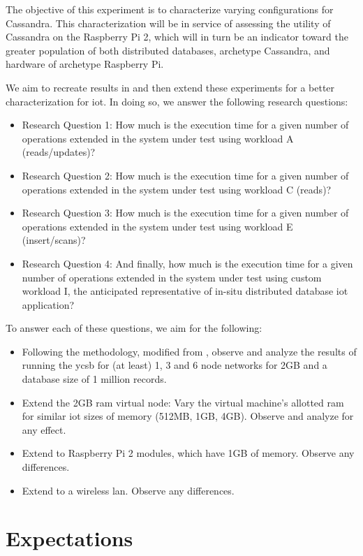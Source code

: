 The objective of this experiment is to characterize varying configurations for Cassandra.  This characterization will be in service of assessing the utility of Cassandra on the Raspberry Pi 2, which will in turn be an indicator toward the greater population of both distributed databases, archetype Cassandra, and hardware of archetype Raspberry Pi.

We aim to recreate results in \cite{Abramova2014} and then extend these experiments for a better characterization for \gls{iot}. In doing so, we answer the following research questions:
\begin{itemize}
\item Research Question 1: How much is the execution time for a given number of operations extended in the system under test using workload A (reads/updates)? 
\item Research Question 2: How much is the execution time for a given number of operations extended in the system under test using workload C (reads)?
\item Research Question 3: How much is the execution time for a given number of operations extended in the system under test using workload E (insert/scans)?
\item Research Question 4: And finally, how much is the execution time for a given number of operations extended in the system under test using custom workload I, the anticipated representative of in-situ distributed database \gls{iot} application?
\end{itemize}

To answer each of these questions, we aim for the following:
\begin{itemize}
\item Following the methodology, modified from \cite{Abramova2014}, observe and analyze the results of running the \gls{ycsb} for (at least) 1, 3 and 6 node networks for 2GB and a database size of 1 million records.
\item Extend the 2GB \gls{ram} virtual node: Vary the virtual machine's allotted \gls{ram} for similar \gls{iot} sizes of memory (512MB, 1GB, 4GB).  Observe and analyze for any effect.
\item Extend to Raspberry Pi 2 modules, which have 1GB of memory.  Observe any differences.
\item Extend to a wireless \gls{lan}.  Observe any differences.
\end{itemize}

\section{Expectations}

